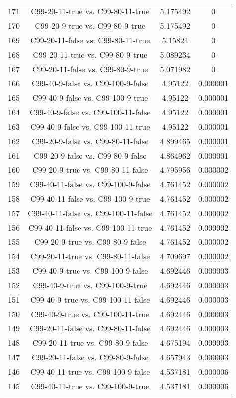 \documentclass[a4paper,10pt]{article}
\begin{document}
\begin{landscape}
\begin{table}[!htp]
\begin{tabular}{cccc}
171&C99-20-11-true vs. C99-80-11-true&5.175492&0\\
170&C99-20-9-true vs. C99-80-9-true&5.175492&0\\
169&C99-20-11-false vs. C99-80-11-true&5.15824&0\\
168&C99-20-11-true vs. C99-80-9-true&5.089234&0\\
167&C99-20-11-false vs. C99-80-9-true&5.071982&0\\
166&C99-40-9-false vs. C99-100-9-false&4.95122&0.000001\\
165&C99-40-9-false vs. C99-100-9-true&4.95122&0.000001\\
164&C99-40-9-false vs. C99-100-11-false&4.95122&0.000001\\
163&C99-40-9-false vs. C99-100-11-true&4.95122&0.000001\\
162&C99-20-9-false vs. C99-80-11-false&4.899465&0.000001\\
161&C99-20-9-false vs. C99-80-9-false&4.864962&0.000001\\
160&C99-20-9-true vs. C99-80-11-false&4.795956&0.000002\\
159&C99-40-11-false vs. C99-100-9-false&4.761452&0.000002\\
158&C99-40-11-false vs. C99-100-9-true&4.761452&0.000002\\
157&C99-40-11-false vs. C99-100-11-false&4.761452&0.000002\\
156&C99-40-11-false vs. C99-100-11-true&4.761452&0.000002\\
155&C99-20-9-true vs. C99-80-9-false&4.761452&0.000002\\
154&C99-20-11-true vs. C99-80-11-false&4.709697&0.000002\\
153&C99-40-9-true vs. C99-100-9-false&4.692446&0.000003\\
152&C99-40-9-true vs. C99-100-9-true&4.692446&0.000003\\
151&C99-40-9-true vs. C99-100-11-false&4.692446&0.000003\\
150&C99-40-9-true vs. C99-100-11-true&4.692446&0.000003\\
149&C99-20-11-false vs. C99-80-11-false&4.692446&0.000003\\
148&C99-20-11-true vs. C99-80-9-false&4.675194&0.000003\\
147&C99-20-11-false vs. C99-80-9-false&4.657943&0.000003\\
146&C99-40-11-true vs. C99-100-9-false&4.537181&0.000006\\
145&C99-40-11-true vs. C99-100-9-true&4.537181&0.000006\\

\end{tabular}
\end{table}
\end{landscape}
\end{document}
